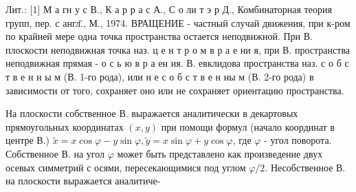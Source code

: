 \documentclass[10pt]{article}
\begin{document}
Лит.: [1] М а гн у с В., К а р р а с А., С о ли т э р Д., Комбинаторная теория групп, пер. с англ̈̈., М., 1974. ВРАЩЕНИЕ - частный случай движения, при к-ром по крайней мере одна точка пространства остается неподвижной. При В. плоскости неподвижная точка наз. ц е н т р о м в р а е ни я, при В. пространства неподвижная прямая - о с ь ю в р а ен ия. В. евклидова пространства наз. с о б с т в е н н ы м (В. 1-го рода), или н е с о б с т в е н ны м (В. 2-го рода) в зависимости от того, сохраняет оно или не сохраняет ориентацию пространства.



На плоскости собственное В. выражается аналитически в декартовых прямоугольных координатах $(x, y)$ при помощи формул (начало координат в центре В.) $\tilde{x}=x \cos \varphi-y \sin \varphi, \tilde{y}=x \sin \varphi+y \cos \varphi$, где $\varphi$ - угол поворота. Собственное В. на угол $\varphi$ может быть представлено как произведение двух осевых симметрий с осями, пересекающимися под углом $\varphi / 2$. Несобственное В. на плоскости выражается аналитиче-
\end{document}
